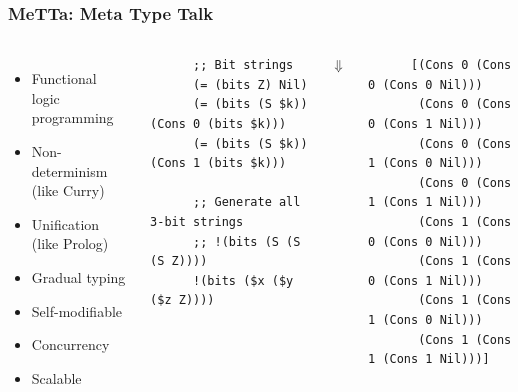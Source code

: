 \documentclass[aspectratio=169]{beamer}
\begin{document}
\begin{frame}[fragile]

  \frametitle{MeTTa: Meta Type Talk}

  \begin{columns}

    \column{7cm}
    \begin{itemize}
    \item Functional logic programming
    \item Non-determinism (like Curry)
    \item Unification (like Prolog)
    \item Gradual typing
    \item Self-modifiable
    \item Concurrency
    \item Scalable
    \end{itemize}

    \column{7cm}

    \begin{lstlisting}
      ;; Bit strings
      (= (bits Z) Nil)
      (= (bits (S $k)) (Cons 0 (bits $k)))
      (= (bits (S $k)) (Cons 1 (bits $k)))

      ;; Generate all 3-bit strings
      ;; !(bits (S (S (S Z))))
      !(bits ($x ($y ($z Z))))
    \end{lstlisting}

    \begin{center}
      $\Downarrow$
    \end{center}

    \begin{lstlisting}
      [(Cons 0 (Cons 0 (Cons 0 Nil)))
       (Cons 0 (Cons 0 (Cons 1 Nil)))
       (Cons 0 (Cons 1 (Cons 0 Nil)))
       (Cons 0 (Cons 1 (Cons 1 Nil)))
       (Cons 1 (Cons 0 (Cons 0 Nil)))
       (Cons 1 (Cons 0 (Cons 1 Nil)))
       (Cons 1 (Cons 1 (Cons 0 Nil)))
       (Cons 1 (Cons 1 (Cons 1 Nil)))]
    \end{lstlisting}

  \end{columns}

\end{frame}
\end{document}
